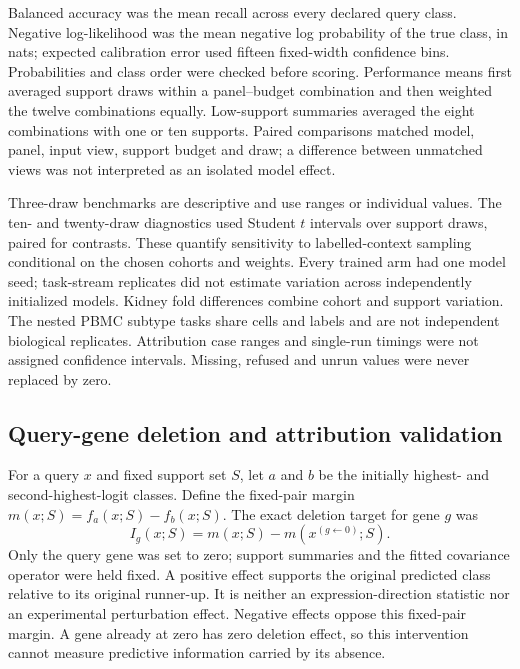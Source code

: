 Balanced accuracy was the mean recall across every declared query class. Negative log-likelihood was the mean negative log probability of the true class, in nats; expected calibration error used fifteen fixed-width confidence bins. Probabilities and class order were checked before scoring. Performance means first averaged support draws within a panel--budget combination and then weighted the twelve combinations equally. Low-support summaries averaged the eight combinations with one or ten supports. Paired comparisons matched model, panel, input view, support budget and draw; a difference between unmatched views was not interpreted as an isolated model effect.

Three-draw benchmarks are descriptive and use ranges or individual values. The ten- and twenty-draw diagnostics used Student $t$ intervals over support draws, paired for contrasts. These quantify sensitivity to labelled-context sampling conditional on the chosen cohorts and weights. Every trained arm had one model seed; task-stream replicates did not estimate variation across independently initialized models. Kidney fold differences combine cohort and support variation. The nested PBMC subtype tasks share cells and labels and are not independent biological replicates. Attribution case ranges and single-run timings were not assigned confidence intervals. Missing, refused and unrun values were never replaced by zero.

\subsection*{Query-gene deletion and attribution validation}

For a query $x$ and fixed support set $S$, let $a$ and $b$ be the initially highest- and second-highest-logit classes. Define the fixed-pair margin $m(x;S)=f_a(x;S)-f_b(x;S)$. The exact deletion target for gene $g$ was
\begin{equation}
 I_g(x;S)=m(x;S)-m(x^{(g\leftarrow0)};S).
\end{equation}
Only the query gene was set to zero; support summaries and the fitted covariance operator were held fixed. A positive effect supports the original predicted class relative to its original runner-up. It is neither an expression-direction statistic nor an experimental perturbation effect. Negative effects oppose this fixed-pair margin. A gene already at zero has zero deletion effect, so this intervention cannot measure predictive information carried by its absence.


